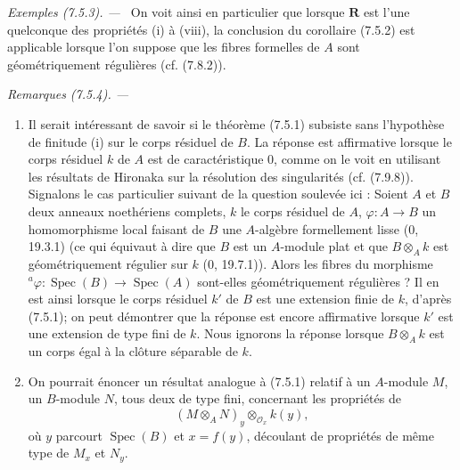 \documentclass[10pt,oneside]{book}
\makeatletter
\newenvironment{examples}[1][]{%
  \par\medskip\noindent\textit{Exemples (#1). ---\ }}{\par}
\newenvironment{remarks}[1][]{%
  \par\medskip\noindent\itshape Remarques (#1). ---\ }{\par}
\newcommand{\EGAReaderTarget}[2]{\hypertarget{#1}{}\@bsphack\begingroup\def\@currentHref{#1}\label{#2}\endgroup\@esphack}
\makeatother
\begin{document}
\begin{examples}[7.5.3]
On voit ainsi en particulier que lorsque $\boldsymbol R$ est l'une quelconque
des propriétés (i) à (viii), la conclusion du corollaire (7.5.2) est applicable
lorsque l'on suppose que les fibres formelles de $A$ sont géométriquement
régulières (cf. (7.8.2)).
\end{examples}

\begin{remarks}[7.5.4]
\EGAReaderTarget{ega4.c04.item.7-5-4}{IV.2.s7.5.4-fr}
\begin{enumerate}
\item[\emph{(i)}] Il serait intéressant de savoir si le théorème (7.5.1)
subsiste sans l'hypothèse de finitude (i) sur le corps résiduel de $B$. La
réponse est affirmative lorsque le corps résiduel $k$ de $A$ est de
caractéristique 0, comme on le voit en utilisant les résultats de Hironaka sur
la résolution des singularités (cf. (7.9.8)). Signalons le cas particulier
suivant de la question soulevée ici : Soient $A$ et $B$ deux anneaux
noethériens complets, $k$ le corps résiduel de $A$,
$\varphi:A\to B$ un homomorphisme local faisant de $B$ une $A$-algèbre
formellement lisse (0, 19.3.1) (ce qui équivaut à dire que $B$ est un
$A$-module plat et que $B\otimes_A k$ est géométriquement régulier sur $k$
(0, 19.7.1)). Alors les fibres du morphisme
${}^a\varphi:\operatorname{Spec}(B)\to\operatorname{Spec}(A)$ sont-elles
géométriquement régulières ? Il en est ainsi lorsque le corps résiduel $k'$ de
$B$ est une extension finie de $k$, d'après (7.5.1); on peut démontrer que la
réponse est encore affirmative lorsque $k'$ est une extension de type fini de
$k$. Nous ignorons la réponse lorsque $B\otimes_A k$ est un corps égal à la
clôture séparable de $k$.

\item[\emph{(ii)}] On pourrait énoncer un résultat analogue à (7.5.1) relatif
à un $A$-module $M$, un $B$-module $N$, tous deux de type fini, concernant les
propriétés de
\[
(M\otimes_A N)_y\otimes_{\mathscr O_x}k(y),
\]
où $y$ parcourt $\operatorname{Spec}(B)$ et $x=f(y)$, découlant de propriétés
de même type de $M_x$ et $N_y$.


\end{enumerate}
\end{remarks}
\end{document}
